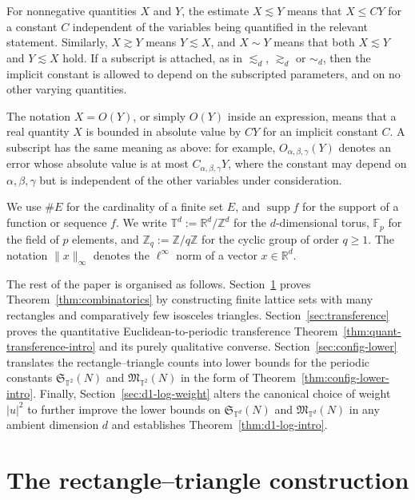 \documentclass[11pt,reqno]{amsart}
\numberwithin{equation}{section}
\newcommand{\norm}[1]{\lVert #1\rVert_\infty}
\newcommand{\supp}{\operatorname{supp}}
\renewcommand{\leq}{\leqslant}
\renewcommand{\geq}{\geqslant}
\begin{document}
For nonnegative quantities $X$ and $Y$, the estimate $X\lesssim Y$ means that $X\leq CY$ for a constant $C$ independent of the variables being quantified in the relevant statement. Similarly, $X\gtrsim Y$ means $Y\lesssim X$, and $X\sim Y$ means that both $X\lesssim Y$ and $Y\lesssim X$ hold. If a subscript is attached, as in $\lesssim_d$, $\gtrsim_d$ or $\sim_d$, then the implicit constant is allowed to depend on the subscripted parameters, and on no other varying quantities. 

The notation $X=O(Y)$, or simply $O(Y)$ inside an expression, means that a real quantity $X$ is bounded in absolute value by $CY$ for an implicit constant $C$. A subscript has the same meaning as above: for example, $O_{\alpha,\beta,\gamma}(Y)$ denotes an error whose absolute value is at most $C_{\alpha,\beta,\gamma}Y$, where the constant may depend on $\alpha,\beta,\gamma$ but is independent of the other variables under consideration.

We use $\#E$ for the cardinality of a finite set $E$, and $\supp f$ for the support of a function or sequence $f$. We write $\mathbb{T}^d := \mathbb{R}^d/\mathbb{Z}^d$ for the $d$-dimensional torus, $\mathbb{F}_p$ for the field of $p$ elements, and $\mathbb{Z}_q := \mathbb{Z}/q\mathbb{Z}$ for the cyclic group of order $q\geq1$. The notation $\norm{x}$ denotes the $\ell^\infty$ norm of a vector $x\in\mathbb{R}^d$.

The rest of the paper is organised as follows. Section~\ref{sec:rectangle-triangle} proves Theorem~\ref{thm:combinatorics} by constructing finite lattice sets with many rectangles and comparatively few isosceles triangles. Section~\ref{sec:transference} proves the quantitative Euclidean-to-periodic transference Theorem~\ref{thm:quant-transference-intro} and its purely qualitative converse. Section~\ref{sec:config-lower} translates the rectangle--triangle counts into lower bounds for the periodic constants $\mathfrak{S}_{\mathbb{T}^2}(N)$ and $\mathfrak{M}_{\mathbb{T}^2}(N)$ in the form of Theorem~\ref{thm:config-lower-intro}. Finally, Section~\ref{sec:d1-log-weight} alters the canonical choice of weight $|u|^2$ to further improve the lower bounds on $\mathfrak{S}_{\mathbb{T}^d}(N)$ and $\mathfrak{M}_{\mathbb{T}^d}(N)$ in any ambient dimension $d$ and establishes Theorem~\ref{thm:d1-log-intro}.


\section{The rectangle--triangle construction}
\label{sec:rectangle-triangle}
\end{document}

